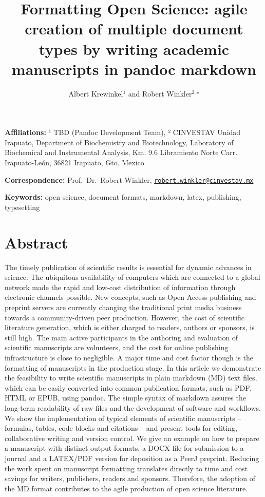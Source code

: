 \documentclass[10pt,fleqn]{wlpeerj}
\title{Formatting
Open
Science:
agile
creation
of
multiple
document
types
by
writing
academic
manuscripts
in
pandoc
markdown}
\author{Albert
Krewinkel\(^1\)
and
Robert
Winkler\(^{2,\star}\)}
\date{}
\begin{document}
\flushbottom
\maketitle
\thispagestyle{empty}

\textbf{Affiliations:}
¹ TBD
(Pandoc
Development
Team),
²
CINVESTAV
Unidad
Irapuato,
Department
of
Biochemistry
and
Biotechnology,
Laboratory
of
Biochemical
and
Instrumental
Analysis,
Km.
9.6
Libramiento
Norte
Carr.
Irapuato-León,
36821
Irapuato,
Gto.
Mexico

\textbf{Correspondence:}
Prof.~Dr.~Robert
Winkler,
\href{mailto:robert.winkler@cinvestav.mx}{\nolinkurl{robert.winkler@cinvestav.mx}}

\textbf{Keywords:}
open
science,
document
formats,
markdown,
latex,
publishing,
typesetting

\section{Abstract}\label{abstract}

The
timely
publication
of
scientific
results
is
essential
for
dynamic
advances
in
science.
The
ubiquitous
availability
of
computers
which
are
connected
to a
global
network
made
the
rapid
and
low-cost
distribution
of
information
through
electronic
channels
possible.
New
concepts,
such
as
Open
Access
publishing
and
preprint
servers
are
currently
changing
the
traditional
print
media
business
towards
a
community-driven
peer
production.
However,
the
cost
of
scientific
literature
generation,
which
is
either
charged
to
readers,
authors
or
sponsors,
is
still
high.
The
main
active
participants
in
the
authoring
and
evaluation
of
scientific
manuscripts
are
volunteers,
and
the
cost
for
online
publishing
infrastructure
is
close
to
negligible.
A
major
time
and
cost
factor
though
is
the
formatting
of
manuscripts
in
the
production
stage.
In
this
article
we
demonstrate
the
feasibility
to
write
scientific
manuscripts
in
plain
markdown
(MD)
text
files,
which
can
be
easily
converted
into
common
publication
formats,
such
as
PDF,
HTML
or
EPUB,
using
pandoc.
The
simple
syntax
of
markdown
assures
the
long-term
readability
of
raw
files
and
the
development
of
software
and
workflows.
We
show
the
implementation
of
typical
elements
of
scientific
manuscripts
--
formulas,
tables,
code
blocks
and
citations
--
and
present
tools
for
editing,
collaborative
writing
and
version
control.
We
give
an
example
on
how
to
prepare
a
manuscript
with
distinct
output
formats,
a
DOCX
file
for
submission
to a
journal
and a
LATEX/PDF
version
for
deposition
as a
PeerJ
preprint.
Reducing
the
work
spent
on
manuscript
formatting
translates
directly
to
time
and
cost
savings
for
writers,
publishers,
readers
and
sponsors.
Therefore,
the
adoption
of
the
MD
format
contributes
to
the
agile
production
of
open
science
literature.
\end{document}
